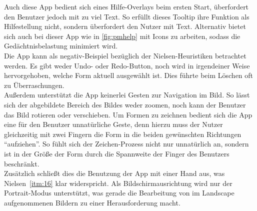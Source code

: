 Auch diese App bedient sich eines Hilfe-Overlays beim ersten Start, überfordert den Benutzer jedoch mit zu viel Text. So erfüllt dieses Tooltip ihre Funktion als Hilfestellung nicht, sondern überfordert den Nutzer mit Text. Alternativ bietet sich auch bei dieser App wie in \autoref{fig:pmhelp} mit Icons zu arbeiten, sodass die Gedächtnisbelastung minimiert wird. \\

Die App kann als negativ-Beispiel bezüglich der Nielsen-Heuristiken betrachtet werden. Es gibt weder Undo- oder Redo-Button, noch wird in irgendeiner Weise hervorgehoben, welche Form aktuell ausgewählt ist. Dies führte beim Löschen oft zu Überraschungen. \\

 Außerdem unterstützt die App keinerlei Gesten zur Navigation im Bild. So lässt sich der abgebildete Bereich des Bildes weder zoomen, noch kann der Benutzer das Bild rotieren oder verschieben. Um Formen zu zeichnen bedient sich die App eine für den Benutzer unnatürliche Geste, denn hierzu muss der Nutzer gleichzeitig mit zwei Fingern die Form in die beiden gewünschten Richtungen ``aufziehen''. So fühlt sich der Zeichen-Prozess nicht nur unnatürlich an, sondern ist in der Größe der Form durch die Spannweite der Finger des Benutzers beschränkt. \\
 
 Zusätzlich schließt dies die Benutzung der App mit einer Hand aus, was Nielsen~\autoref{itm:16} klar widerspricht. Als Bildschirmausrichtung wird nur der Portrait-Modus unterstützt, was gerade die Bearbeitung von im Landscape aufgenommenen Bildern zu einer Herausforderung macht. \\

